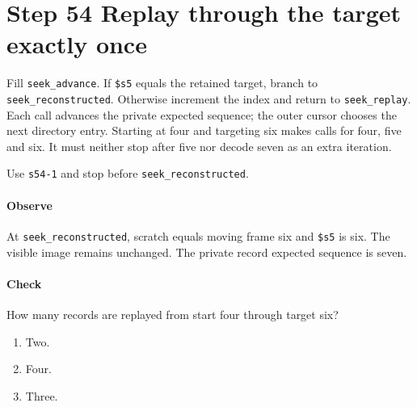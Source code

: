 \section{Step 54 Replay through the target exactly once}
Fill \texttt{seek\_advance}. If \texttt{\$s5} equals the retained target, branch to \texttt{seek\_reconstructed}. Otherwise increment the index and return to \texttt{seek\_replay}. Each call advances the private expected sequence; the outer cursor chooses the next directory entry. Starting at four and targeting six makes calls for four, five and six. It must neither stop after five nor decode seven as an extra iteration.

Use \texttt{s54-1} and stop before \texttt{seek\_reconstructed}.

\paragraph{Observe} At \texttt{seek\_reconstructed}, scratch equals moving frame six and \texttt{\$s5} is six. The visible image remains unchanged. The private record expected sequence is seven.

\paragraph{Check} How many records are replayed from start four through target six?
\begin{enumerate}[label=\Alph*.]
  \item Two.
  \item Four.
  \item Three.
\end{enumerate}
